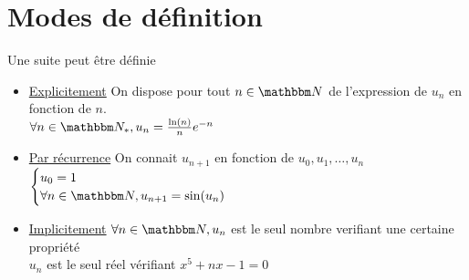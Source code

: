 \part{Modes de définition}

\begin{defn}
	Une suite peut être définie
	\begin{itemize}
		\item \underline{Explicitement}
			On dispose pour tout $n \in \N$ de l'expression de $u_n$ en fonction de $n$.\\
			\ex $\forall n \in \N_*, u_n = \frac{\ln(n)}{n}e^{-n}$\\
		\item \underline{Par récurrence}
			On connait $u_{n+1}$ en fonction de  $u_0, u_1, \ldots, u_n$\\
			\ex $\begin{cases}
				u_0=1\\
				\forall n \in \N, u_{n+1} = \sin(u_n)
			\end{cases}$\\
		\item \underline{Implicitement}
			$\forall n \in \N, u_n$ est le seul nombre verifiant une certaine propriété\\
			\ex $u_n$ est le seul réel vérifiant  $x^5 + nx - 1 = 0$
	\end{itemize}
\end{defn}
